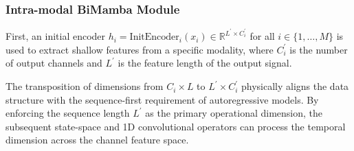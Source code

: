 \documentclass[11pt,a4paper]{article}
\newcommand{\R}{\mathbb{R}}
\begin{document}
	\subsubsection{Intra-modal BiMamba Module}
	First, an initial encoder $h_{i} = \text{InitEncoder}_{i}(x_{i}) \in \R^{L^{\prime}\times C_{i}^{\prime}}$ for all $i\in\{1,\dots,M\}$ is used to extract shallow features from a specific modality, where $C_{i}^{\prime}$ is the number of output channels and $L^{\prime}$ is the feature length of the output signal. 
	
	The transposition of dimensions from $C_i \times L$ to $L^{\prime} \times C_i^{\prime}$ physically aligns the data structure with the sequence-first requirement of autoregressive models. By enforcing the sequence length $L^{\prime}$ as the primary operational dimension, the subsequent state-space and 1D convolutional operators can process the temporal dimension across the channel feature space.
	
\end{document}
